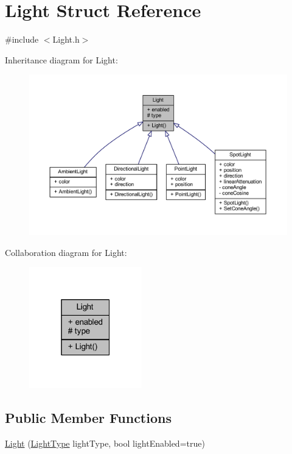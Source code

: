 \hypertarget{struct_light}{}\section{Light Struct Reference}
\label{struct_light}


{\ttfamily \#include $<$Light.\+h$>$}



Inheritance diagram for Light\+:\nopagebreak
\begin{figure}[H]
\begin{center}
\leavevmode
\includegraphics[width=350pt]{struct_light__inherit__graph}
\end{center}
\end{figure}


Collaboration diagram for Light\+:\nopagebreak
\begin{figure}[H]
\begin{center}
\leavevmode
\includegraphics[width=139pt]{struct_light__coll__graph}
\end{center}
\end{figure}
\subsection*{Public Member Functions}
\begin{DoxyCompactItemize}
\item 
\hyperlink{struct_light_a0df5e58af351bd13c996da2880be0dee}{Light} (\hyperlink{_light_8h_a3336214f41ddc8acd932fa9be957047d}{Light\+Type} light\+Type, bool light\+Enabled=true)
\end{DoxyCompactItemize}
